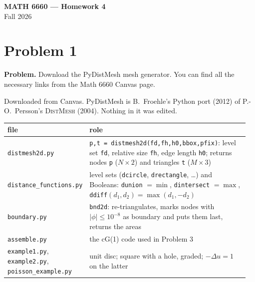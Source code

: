 \documentclass[11pt]{article}
\newcommand{\abs}[1]{\lvert #1\rvert}
\newcommand{\lap}{\Delta}
\newcommand{\problem}[2]{%
  \section*{Problem #1}%
  \renewcommand{\theequation}{#2.\arabic{equation}}%
  \setcounter{equation}{0}}
\begin{document}
\begin{center}
  {\large\bfseries MATH 6660 --- Homework 4}\\[2pt]
  {\small Fall 2026}
\end{center}



\problem{1}{1}

\textbf{Problem.} Download the PyDistMesh mesh generator.  You can find all the
necessary links from the Math 6660 Canvas page.

\begin{steps}
\item Downloaded from Canvas.  PyDistMesh is B.~Froehle's Python port (2012)
      of P.-O.~Persson's \textsc{DistMesh} (2004).  Nothing in it was edited.
\end{steps}

\begin{center}
\begin{minipage}{\linewidth}
\centering\footnotesize
\begin{tabular}{@{}>{\raggedright\arraybackslash}p{0.27\linewidth}>{\raggedright\arraybackslash}p{0.69\linewidth}@{}}
\toprule
file & role\\
\midrule
\texttt{distmesh2d.py} & \texttt{p,t = distmesh2d(fd,fh,h0,bbox,pfix)}: level set
  \texttt{fd}, relative size \texttt{fh}, edge length \texttt{h0}; returns
  nodes \texttt{p} ($N\times2$) and triangles \texttt{t} ($M\times3$)\\
\texttt{distance\_functions.py} & level sets (\texttt{dcircle},
  \texttt{drectangle}, \dots) and Booleans: \texttt{dunion} $=\min$,
  \texttt{dintersect} $=\max$, \texttt{ddiff}$(d_1,d_2)=\max(d_1,-d_2)$\\
\texttt{boundary.py} & \texttt{bnd2d}: re-triangulates, marks nodes with
  $\abs{\phi}\le10^{-8}$ as boundary and puts them last, returns the areas\\
\texttt{assemble.py} & the cG(1) code used in Problem 3\\
\texttt{example1.py}, \texttt{example2.py}, \texttt{poisson\_example.py} &
  unit disc; square with a hole, graded; $-\lap u=1$ on the latter\\
\bottomrule
\end{tabular}
\label{tab:p1files}
\end{minipage}
\end{center}
\end{document}
